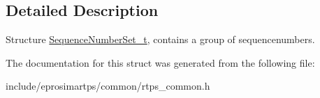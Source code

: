 \subsection{\-Detailed \-Description}
\-Structure \hyperlink{structeprosima_1_1rtps_1_1_sequence_number_set__t}{\-Sequence\-Number\-Set\-\_\-t}, contains a group of sequencenumbers. 

\-The documentation for this struct was generated from the following file\-:\begin{DoxyCompactItemize}
\item 
include/eprosimartps/common/rtps\-\_\-common.\-h\end{DoxyCompactItemize}
